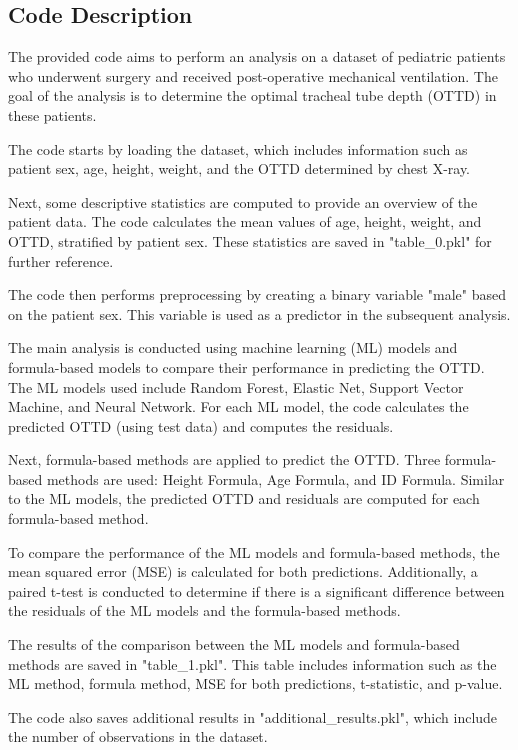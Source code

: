 \documentclass[11pt]{article}
\begin{document}
\subsection{Code Description}

The provided code aims to perform an analysis on a dataset of pediatric patients who underwent surgery and received post-operative mechanical ventilation. The goal of the analysis is to determine the optimal tracheal tube depth (OTTD) in these patients.

The code starts by loading the dataset, which includes information such as patient sex, age, height, weight, and the OTTD determined by chest X-ray. 

Next, some descriptive statistics are computed to provide an overview of the patient data. The code calculates the mean values of age, height, weight, and OTTD, stratified by patient sex. These statistics are saved in "table\_0.pkl" for further reference.

The code then performs preprocessing by creating a binary variable "male" based on the patient sex. This variable is used as a predictor in the subsequent analysis.

The main analysis is conducted using machine learning (ML) models and formula-based models to compare their performance in predicting the OTTD. The ML models used include Random Forest, Elastic Net, Support Vector Machine, and Neural Network. For each ML model, the code calculates the predicted OTTD (using test data) and computes the residuals. 

Next, formula-based methods are applied to predict the OTTD. Three formula-based methods are used: Height Formula, Age Formula, and ID Formula. Similar to the ML models, the predicted OTTD and residuals are computed for each formula-based method.

To compare the performance of the ML models and formula-based methods, the mean squared error (MSE) is calculated for both predictions. Additionally, a paired t-test is conducted to determine if there is a significant difference between the residuals of the ML models and the formula-based methods.

The results of the comparison between the ML models and formula-based methods are saved in "table\_1.pkl". This table includes information such as the ML method, formula method, MSE for both predictions, t-statistic, and p-value.

The code also saves additional results in "additional\_results.pkl", which include the number of observations in the dataset.
\end{document}
